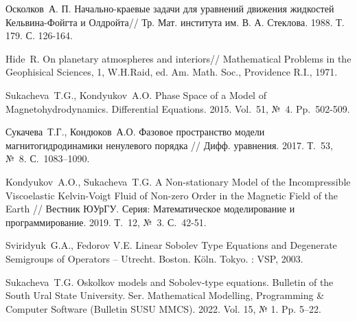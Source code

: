 \begin{thebibliography}{99} %
 Осколков~А. П. Начально-краевые задачи для уравнений движения жидкостей Кельвина-Фойгта и Олдройта// Тр. Мат. института им. В. А. Стеклова. 1988. Т. 179. С. 126-164.

Hide~R.
On planetary atmospheres and interiors// Mathematical Problems in the Geophisical Sciences, 1, W.H.Raid, ed. Am. Math. Soc., Providence R.I., 1971.

Sukacheva~T.G., Kondyukov~A.O.
Phase Space of a Model of Magnetohydrodynamics. 
Differential Equations.
2015.  Vol.~51, №~4. Pp.~502-509. %


Сукачева~Т.Г.,  Кондюков~А.О.
Фазовое пространство модели магнитогидродинамики ненулевого порядка // Дифф. уравнения.  2017.  Т.~53, №~8.  С.~1083--1090.


Kondyukov~A.O., Sukacheva~T.G. A Non-stationary Model of the Incompressible Viscoelastic Kelvin-Voigt Fluid of Non-zero Order in the  Magnetic Field of the Earth // Вестник ЮУрГУ. Серия: Математическое моделирование и программирование. 2019.
  Т.~12,  №~3.  С.~42-51.


Sviridyuk~G.A., Fedorov V.E.
Linear Sobolev Type Equations and Degenerate Semigroups of Operators -- Utrecht. Boston. K\"oln. Tokyo. : VSP, 2003.

 Sukacheva~T.G. Oskolkov models and Sobolev-type equations. Bulletin of the South Ural State University. Ser. Mathematical Modelling, Programming
\& Computer Software (Bulletin SUSU MMCS). 2022. Vol. 15, № 1. Pp. 5--22.



\end{thebibliography}





%

